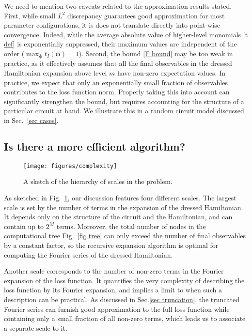 \documentclass[twocolumn, amsfonts, amssymb, aps, nofootinbib]{revtex4-2}
\begin{document}
We need to mention two caveats related to the approximation results stated. First, while small $L^2$ discrepancy guarantees good approximation for most parameter configurations, it is does not translate directly into point-wise convergence. Indeed, while the average absolute value of higher-level monomials \eqref{t def} is exponentially suppressed, their maximum values are independent of the order ($\operatorname{max}_{\pmb\phi}{t}_{I}(\pmb\phi)=1$). Second, the bound \eqref{F bound} may be too weak in practice, as it effectively assumes that all the final observables in the dressed Hamiltonian expansion above level $m$ have non-zero expectation values. In practice, we expect that only an exponentially small fraction of observables contributes to the loss function norm. Properly taking this into account can significantly strengthen the bound, but requires accounting for the structure of a particular circuit at hand. We illustrate this in a random circuit model discussed in Sec.~\ref{sec cases}.
\subsection{Is there a more efficient algorithm?} \label{sec complexity}
\begin{figure}
	\texttt{[image: figures/complexity]}
	\caption{A sketch of the hierarchy of scales in the problem.}
	\label{fig complexity}
\end{figure}
As sketched in Fig.~\ref{fig complexity}, our discussion features four different scales. The largest scale is set by the number of terms in the expansion of the dressed Hamiltonian. It depends only on the structure of the circuit and the Hamiltonian, and can contain up to $2^M$ terms. Moreover, the total number of nodes in the computational tree Fig.~\ref{fig tree} can only exceed the number of final observables by a constant factor, so the recursive expansion algorithm is optimal for computing the Fourier series of the dressed Hamiltonian.

Another scale corresponds to the number of non-zero terms in the Fourier expansion of the loss function. It quantifies the very complexity of describing the loss function by its Fourier expansion, and implies a limit to when such a description can be practical. As discussed in Sec.\eqref{sec truncation}, the truncated Fourier series can furnish good approximation to the full loss function while containing only a small fraction of all non-zero terms, which leads us to associate a separate scale to it.
\end{document}
